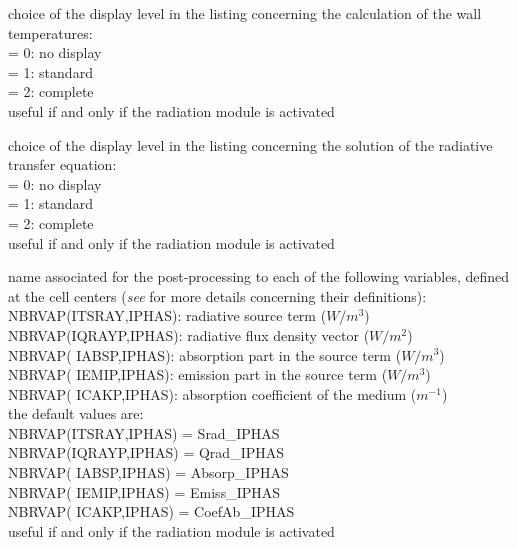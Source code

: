 {choice of the display level in the listing concerning the calculation of
the wall temperatures:\\
\hspace*{1.3cm}= 0: no display\\
\hspace*{1.3cm}= 1: standard\\
\hspace*{1.3cm}= 2: complete\\
useful if and only if the radiation module is activated}

{choice of the display level in the listing concerning the solution of
the radiative transfer equation:\\
\hspace*{1.3cm}= 0: no display\\
\hspace*{1.3cm}= 1: standard\\
\hspace*{1.3cm}= 2: complete\\
useful if and only if the radiation module is activated}

{name associated for the post-processing to each of the following variables,
defined at the cell centers ({\it see}
\cite{Douce02} for more details concerning their definitions):\\
\hspace*{1.3cm} NBRVAP(ITSRAY,IPHAS): radiative source term ($W/m^3$)\\
\hspace*{1.3cm} NBRVAP(IQRAYP,IPHAS): radiative flux density vector ($W/m^2$)\\
\hspace*{1.3cm} NBRVAP( IABSP,IPHAS): absorption part in the source term
($W/m^3$)\\
\hspace*{1.3cm} NBRVAP( IEMIP,IPHAS): emission part in the source term
($W/m^3$)\\
\hspace*{1.3cm} NBRVAP( ICAKP,IPHAS): absorption coefficient of the
medium ($m^{-1}$)\\
the default values are: \\
\hspace*{1.3cm} NBRVAP(ITSRAY,IPHAS) = Srad\_IPHAS \\
\hspace*{1.3cm} NBRVAP(IQRAYP,IPHAS) = Qrad\_IPHAS \\
\hspace*{1.3cm} NBRVAP( IABSP,IPHAS) = Absorp\_IPHAS \\
\hspace*{1.3cm} NBRVAP( IEMIP,IPHAS) = Emiss\_IPHAS \\
\hspace*{1.3cm} NBRVAP( ICAKP,IPHAS) = CoefAb\_IPHAS \\
useful if and only if the radiation module is activated}

